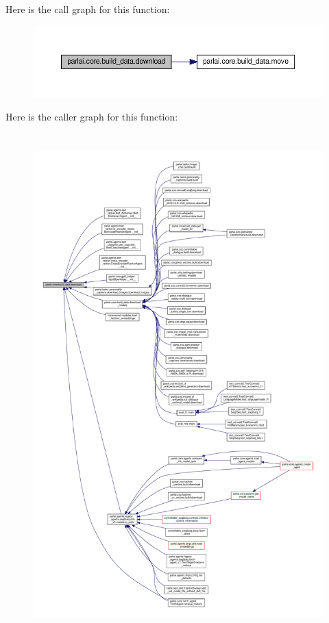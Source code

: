 Here is the call graph for this function\+:
\nopagebreak
\begin{figure}[H]
\begin{center}
\leavevmode
\includegraphics[width=350pt]{namespaceparlai_1_1core_1_1build__data_ab74f0e428f05e5d91fa93c8afb367622_cgraph}
\end{center}
\end{figure}
Here is the caller graph for this function\+:
\nopagebreak
\begin{figure}[H]
\begin{center}
\leavevmode
\includegraphics[height=550pt]{namespaceparlai_1_1core_1_1build__data_ab74f0e428f05e5d91fa93c8afb367622_icgraph}
\end{center}
\end{figure}
\mbox{\label{namespaceparlai_1_1core_1_1build__data_ac9224da5c4e4ce9d1f4ab05e837c1f45}} 
